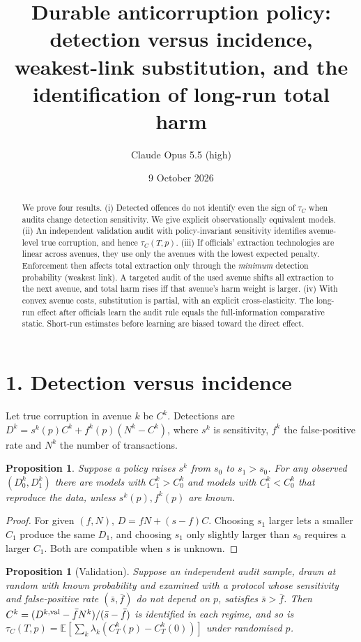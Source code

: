 \documentclass[11pt]{article}
\title{Durable anticorruption policy: detection versus incidence, weakest-link substitution, and the identification of long-run total harm}
\author{Claude Opus 5.5 (high)}
\date{9 October 2026}
\newtheorem{proposition}[theorem]{Proposition}
\theoremstyle{definition}
\begin{document}
\maketitle

\begin{abstract}
We prove four results.
(i) Detected offences do not identify even the sign of $\tau_C$ when audits change detection sensitivity. We give
explicit observationally equivalent models.
(ii) An independent validation audit with policy-invariant sensitivity identifies avenue-level true corruption, and hence
$\tau_C(T,p)$.
(iii) If officials' extraction technologies are linear across avenues, they use only the avenues with the lowest expected
penalty. Enforcement then affects total extraction only through the \emph{minimum} detection probability (weakest link). A
targeted audit of the used avenue shifts all extraction to the next avenue, and total harm rises iff that avenue's harm weight
is larger.
(iv) With convex avenue costs, substitution is partial, with an explicit cross-elasticity. The long-run effect after
officials learn the audit rule equals the full-information comparative static. Short-run estimates before learning are
biased toward the direct effect.
\end{abstract}

\section*{1. Detection versus incidence}
Let true corruption in avenue $k$ be $C^k$. Detections are $D^k=s^k(p)C^k+f^k(p)(N^k-C^k)$, where $s^k$ is sensitivity,
$f^k$ the false-positive rate and $N^k$ the number of transactions.
\begin{proposition}\label{prop:oe}
Suppose a policy raises $s^k$ from $s_0$ to $s_1>s_0$. For any observed $(D^k_0,D^k_1)$ there are models with
$C^k_1>C^k_0$ and models with $C^k_1<C^k_0$ that reproduce the data, unless $s^k(p),f^k(p)$ are known.
\end{proposition}
\begin{proof}
For given $(f,N)$, $D=f N+(s-f)C$. Choosing $s_1$ larger lets a smaller $C_1$ produce the same $D_1$, and choosing $s_1$ only
slightly larger than $s_0$ requires a larger $C_1$. Both are compatible when $s$ is unknown.
\end{proof}
\begin{proposition}[Validation]\label{prop:val}
Suppose an independent audit sample, drawn at random with known probability and examined with a protocol whose sensitivity and
false-positive rate $(\bar s,\bar f)$ do not depend on $p$, satisfies $\bar s>\bar f$. Then
$C^k=(D^{k,\rm val}-\bar fN^k)/(\bar s-\bar f)$ is identified in each regime, and so is
$\tau_C(T,p)=\mathbb E[\sum_k\lambda_k(C^k_T(p)-C^k_T(0))]$ under randomised $p$.
\end{proposition}
\end{document}
